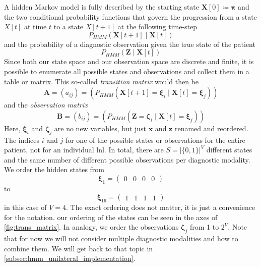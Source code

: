 \documentclass[../ms.tex]{subfiles}
\begin{document}
A hidden Markov model is fully described by the starting state $\mathbf{X}[0] \coloneqq \boldsymbol{\pi}$ and the two conditional probability functions that govern the progression from a state $X[t]$ at time $t$ to a state $X[t+1]$ at the following time-step
%
\begin{equation}
    P_{HMM}\left( \mathbf{X}[t+1] \mid \mathbf{X}[t] \right)
\end{equation}
%
and the probability of a diagnostic observation given the true state of the patient
%
\begin{equation}
    P_{HMM}\left( \mathbf{Z} \mid \mathbf{X}[t] \right)
\end{equation}
%
Since both our state space and our observation space are discrete and finite, it is possible to enumerate all possible states and observations and collect them in a table or matrix. This so-called \emph{transition matrix} would then be
%
\begin{equation}
    \mathbf{A} = \left( a_{ij} \right) = \left( P_{HMM} \left( \mathbf{X}[t+1] = \boldsymbol{\xi}_i \mid \mathbf{X}[t] = \boldsymbol{\xi}_j \right) \right)
\end{equation}
%
and the \emph{observation matrix}
%
\begin{equation}
    \mathbf{B} = \left( b_{ij} \right) = \left( P_{HMM} \left( \mathbf{Z} = \boldsymbol{\zeta}_i \mid \mathbf{X}[t] = \boldsymbol{\xi}_j \right) \right)
\end{equation}
%
Here, $\boldsymbol{\xi}_i$ and $\boldsymbol{\zeta}_j$ are no new variables, but just $\mathbf{x}$ and $\mathbf{z}$ renamed and reordered. The indices $i$ and $j$ for one of the possible states or observations for the entire patient, not for an individual \gls{lnl}. In total, there are $S = |\{ 0,1 \}|^V$ different states and the same number of different possible observations per diagnostic modality. We order the hidden states from
%
\begin{equation}
    \boldsymbol{\xi}_1 = 
    \begin{pmatrix}
        0 & 0 & 0 & 0
    \end{pmatrix}
\end{equation}
%
to
%
\begin{equation} \label{eq:obs_matrix}
    \boldsymbol{\xi}_{16} = 
    \begin{pmatrix}
        1 & 1 & 1 & 1
    \end{pmatrix}
\end{equation}
%
in this case of $V = 4$. The exact ordering does not matter, it is just a convenience for the notation. our ordering of the states can be seen in the axes of \cref{fig:trans_matrix}. In analogy, we order the observations $\boldsymbol{\zeta}_j$ from 1 to $2^V$. Note that for now we will not consider multiple diagnostic modalities and how to combine them. We will get back to that topic in \cref{subsec:hmm_unilateral_implementation}.
\end{document}
